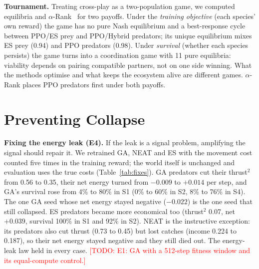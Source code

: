 \documentclass[conference]{IEEEtran}
\newcommand{\todo}[1]{\textcolor{red}{[TODO: #1]}}
\begin{document}
\textbf{Tournament.} Treating cross-play as a two-population game, we computed equilibria and $\alpha$-Rank~\cite{omidshafiei2019} for two payoffs. Under the \emph{training objective} (each species' own reward) the game has no pure Nash equilibrium and a best-response cycle between PPO/ES prey and PPO/Hybrid predators; its unique equilibrium mixes ES prey (0.94) and PPO predators (0.98). Under \emph{survival} (whether each species persists) the game turns into a coordination game with 11 pure equilibria: viability depends on pairing compatible partners, not on one side winning. What the methods optimise and what keeps the ecosystem alive are different games. $\alpha$-Rank places PPO predators first under both payoffs.

\section{Preventing Collapse}
\label{sec:fixes}

\textbf{Fixing the energy leak (E4).} If the leak is a signal problem, amplifying the signal should repair it. We retrained GA, NEAT and ES with the movement cost counted five times in the training reward; the world itself is unchanged and evaluation uses the true costs (Table~\ref{tab:fixes}). GA predators cut their thrust$^2$ from 0.56 to 0.35, their net energy turned from $-0.009$ to $+0.014$ per step, and GA's survival rose from 4\% to 80\% in S1 (0\% to 60\% in S2, 8\% to 76\% in S4). The one GA seed whose net energy stayed negative ($-0.022$) is the one seed that still collapsed. ES predators became more economical too (thrust$^2$ 0.07, net $+0.039$, survival 100\% in S1 and 92\% in S2). NEAT is the instructive exception: its predators also cut thrust (0.73 to 0.45) but lost catches (income 0.224 to 0.187), so their net energy stayed negative and they still died out. The energy-leak law held in every case. \todo{E1: GA with a 512-step fitness window and its equal-compute control.}
\end{document}

